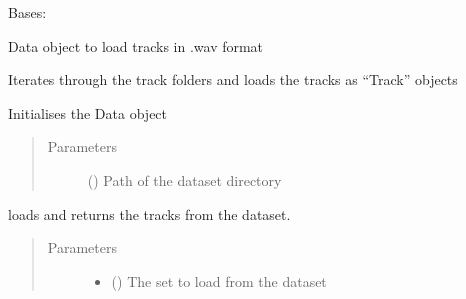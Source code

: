 \documentclass[letterpaper,10pt,english,openany,oneside]{sphinxmanual}
\begin{document}
\begin{fulllineitems}
\label{\detokenize{docs/source/preprocess:preprocess.data.Data}}
Bases: 

Data object to load tracks in .wav format

\begin{fulllineitems}
\label{\detokenize{docs/source/preprocess:preprocess.data.Data.get_tracks}}
Iterates through the track folders and loads the tracks as “Track” objects

\end{fulllineitems}


\begin{fulllineitems}
\label{\detokenize{docs/source/preprocess:preprocess.data.Data.__init__}}
Initialises the Data object
\begin{quote}\begin{description}
\item[{Parameters}] \leavevmode
{} () \textendash{} Path of the dataset directory

\end{description}\end{quote}

\end{fulllineitems}


\begin{fulllineitems}
loads and returns the tracks from the dataset.
\begin{quote}\begin{description}
\item[{Parameters}] \leavevmode\begin{itemize}
\item {} 
 () \textendash{} The set to load from the dataset


\end{itemize}
\end{description}
\end{quote}
\end{fulllineitems}
\end{fulllineitems}
\end{document}
